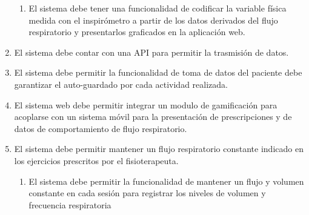 \documentclass[12pt]{article}
\begin{document}
\begin{enumerate}[start=1,label={\bfseries RF0\arabic*.}]
\begin{enumerate}[label*=\arabic*.]
                \item El sistema debe tener una funcionalidad de codificar la variable física medida con el inspirómetro a partir de los datos derivados del flujo respiratorio y presentarlos graficados en la aplicación web. %
            
            \end{enumerate}
        

      
    
    
    \item El sistema debe contar con una API para permitir la trasmisión de datos.
    
   
    
    
   
    \item El sistema debe permitir la funcionalidad de toma de datos del paciente debe garantizar el auto-guardado por cada actividad realizada.
    
    
  
    
    
    \item El sistema web debe permitir integrar un modulo de gamificación para acoplarse con un sistema móvil para la presentación de  prescripciones y  de datos de comportamiento de  flujo respiratorio.
    
     
    
    \item El sistema debe permitir mantener un flujo  respiratorio constante indicado en los ejercicios prescritos por el fisioterapeuta.
    \label{RF21}
            \begin{enumerate}[label*=\arabic*.]
            
                \item El sistema debe permitir la funcionalidad de mantener un flujo y volumen constante en cada sesión para registrar los niveles de volumen y frecuencia respiratoria 
            \end{enumerate}
    
        


\end{enumerate}
\end{document}
